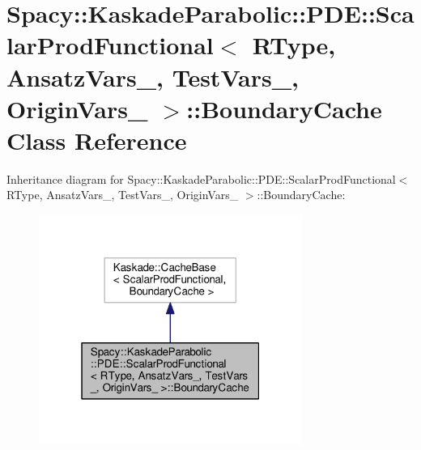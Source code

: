 \hypertarget{classSpacy_1_1KaskadeParabolic_1_1PDE_1_1ScalarProdFunctional_1_1BoundaryCache}{\section{Spacy\-:\-:Kaskade\-Parabolic\-:\-:P\-D\-E\-:\-:Scalar\-Prod\-Functional$<$ R\-Type, Ansatz\-Vars\-\_\-, Test\-Vars\-\_\-, Origin\-Vars\-\_\- $>$\-:\-:Boundary\-Cache Class Reference}
\label{classSpacy_1_1KaskadeParabolic_1_1PDE_1_1ScalarProdFunctional_1_1BoundaryCache}
}


Inheritance diagram for Spacy\-:\-:Kaskade\-Parabolic\-:\-:P\-D\-E\-:\-:Scalar\-Prod\-Functional$<$ R\-Type, Ansatz\-Vars\-\_\-, Test\-Vars\-\_\-, Origin\-Vars\-\_\- $>$\-:\-:Boundary\-Cache\-:
\nopagebreak
\begin{figure}[H]
\begin{center}
\leavevmode
\includegraphics[width=244pt]{classSpacy_1_1KaskadeParabolic_1_1PDE_1_1ScalarProdFunctional_1_1BoundaryCache__inherit__graph}
\end{center}
\end{figure}


